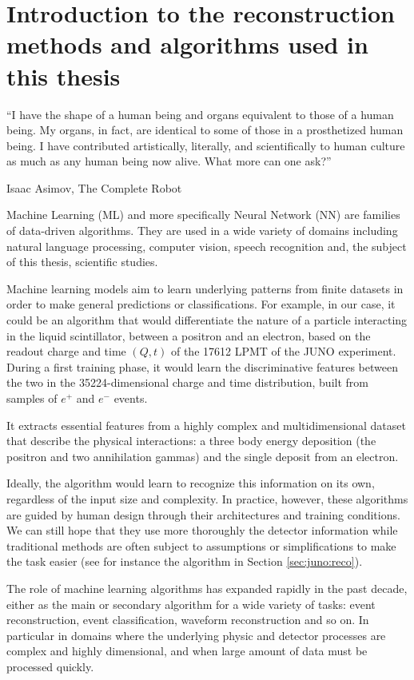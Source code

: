 \documentclass[../main.tex]{subfiles}
\begin{document}
\chapter{Introduction to the reconstruction methods and algorithms used in this thesis}
\label{sec:ml}

\epigraph{``I have the shape of a human being and organs equivalent to those of a human being. My organs, in fact, are identical to some of those in a prosthetized human being. I have contributed artistically, literally, and scientifically to human culture as much as any human being now alive. What more can one ask?''}{Isaac Asimov, The Complete Robot}

\minitoc

Machine Learning (ML) and more specifically Neural Network (NN) are families of data-driven algorithms. They are used in a wide variety of domains including natural language processing, computer vision, speech recognition and, the subject of this thesis, scientific studies.

Machine learning models aim to learn underlying patterns from finite datasets in order to make general predictions or classifications.
For example, in our case, it could be an algorithm that would differentiate the nature of a particle interacting in the liquid scintillator, between a positron and an electron, based on the readout charge and time $(Q, t)$ of the 17612 LPMT of the JUNO experiment. During a first training phase, it would learn the discriminative features between the two in the 35224-dimensional charge and time distribution, built from samples of $e^+$ and $e^-$ events.

It extracts essential features from a highly complex and multidimensional dataset that describe the physical interactions: a three body energy deposition (the positron and two annihilation gammas) and the single deposit from an electron.

Ideally, the algorithm would learn to recognize this information on its own, regardless of the input size and complexity. In practice, however, these algorithms are guided by human design through their architectures and training conditions. We can still hope that they use more thoroughly the detector information while traditional methods are often subject to assumptions or simplifications to make the task easier (see for instance the algorithm in Section \ref{sec:juno:reco}).

The role of machine learning algorithms has expanded rapidly in the past decade, either as the main or secondary algorithm for a wide variety of tasks: event reconstruction, event classification, waveform reconstruction and so on. In particular in domains where the underlying physic and detector processes are complex and highly dimensional, and when large amount of data must be processed quickly.
\end{document}
